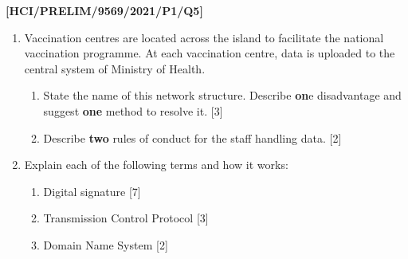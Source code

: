 \item \textbf{{[}HCI/PRELIM/9569/2021/P1/Q5{]}}
\begin{enumerate}
\item Vaccination centres are located across the island to facilitate the
national vaccination programme. At each vaccination centre, data is
uploaded to the central system of Ministry of Health. 
\begin{enumerate}
\item State the name of this network structure. Describe \textbf{on}e disadvantage
and suggest \textbf{one} method to resolve it. \hfill{}{[}3{]}
\item Describe \textbf{two} rules of conduct for the staff handling data.
\hfill{}{[}2{]}
\end{enumerate}
\item Explain each of the following terms and how it works: 
\begin{enumerate}
\item Digital signature \hfill{}{[}7{]}
\item Transmission Control Protocol \hfill{}{[}3{]}
\item Domain Name System\hfill{} {[}2{]}
\end{enumerate}
\end{enumerate}